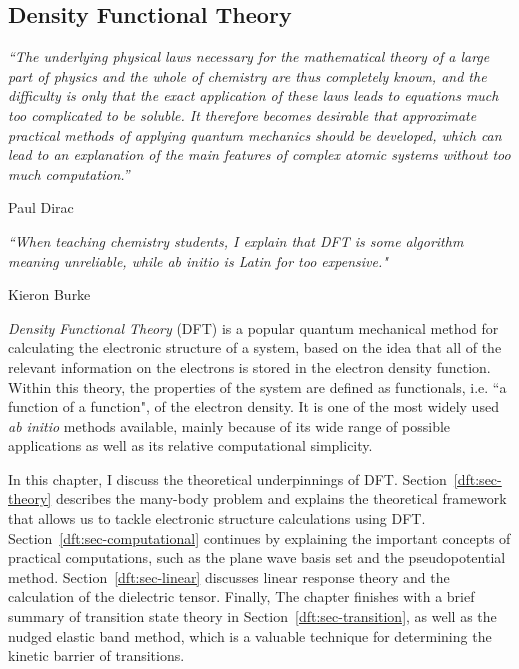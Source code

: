\begin{refsection} 
 
\chapter{Density Functional Theory} \label{chapter:dft}
 
\setlength{\epigraphwidth}{4in} 
\epigraph{\textit{``The underlying physical laws necessary for the 
mathematical theory of a large part of physics and the whole of chemistry are 
thus completely known, and the difficulty is only that the exact application 
of these laws leads to equations much too complicated to be soluble. It 
therefore becomes desirable that approximate practical methods of applying 
quantum mechanics should be developed, which can lead to an explanation of the 
main features of complex atomic systems without too much computation.''}}{Paul 
Dirac} 
\vspace{2em} 
 
\setlength{\epigraphwidth}{4in} 
\epigraph{\textit{``When teaching chemistry students, I explain that DFT is 
some algorithm meaning unreliable, while ab initio is Latin for too 
expensive."}}{Kieron Burke} 
\vspace{3em} 
 
\textit{Density Functional Theory} (DFT) is a popular quantum mechanical 
method for calculating the electronic structure of a system, based on the idea 
that all of the relevant information on the electrons is stored in the 
electron density function. Within this theory, the properties of the system 
are defined as functionals, i.e. ``a function of a function", of the electron 
density. It is one of the most widely used \textit{ab initio} methods 
available, mainly because of its wide range of possible applications as well 
as its relative computational simplicity.  
 
In this chapter, I discuss the theoretical underpinnings of DFT. 
Section~\ref{dft:sec-theory} describes the many-body problem and explains the 
theoretical framework that allows us to tackle electronic structure 
calculations using DFT. Section~\ref{dft:sec-computational} continues by 
explaining the important concepts of practical computations, such as the plane 
wave basis set and the pseudopotential method. 
Section~\ref{dft:sec-linear} discusses 
linear response theory and the calculation of the dielectric tensor. Finally, 
The chapter finishes with a brief summary of transition state theory in 
Section~\ref{dft:sec-transition}, as well as the nudged elastic band method, 
which is a valuable technique for determining the kinetic barrier of 
transitions.  
 

\end{refsection}
